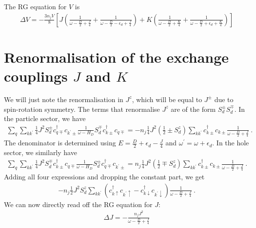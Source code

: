\documentclass{report}
\numberwithin{equation}{section}
\begin{document}
\begin{appendices}
The RG equation for \(V\) is
\begin{equation}\begin{aligned}
	\Delta V = -\frac{3n_j V}{8}\left[J\left(\frac{1}{\omega - \frac{D}{2} + \frac{J}{4}} + \frac{1}{\omega - \frac{D}{2} - \epsilon_d + \frac{J}{4}}\right) + K \left(\frac{1}{\omega - \frac{D}{2} + \frac{K}{4}} + \frac{1}{\omega - \frac{D}{2} + \epsilon_d + \frac{K}{4}}\right)\right]
\end{aligned}\end{equation}

\section{Renormalisation of the exchange couplings \(J\) and \(K\)}
We will just note the renormalisation in \(J^z\), which will be equal to \(J^\pm\) due to spin-rotation symmetry. The terms that renormalise \(J^z\) are of the form \(S_d^\pm S_d^\mp\). In the particle sector, we have
\begin{equation}\begin{aligned}
	\sum_{q} \sum_{kk^\prime}\frac{1}{4}J^2 S_d^\pm c^\dagger_{q\mp}c_{k^\prime\pm} \frac{1}{\omega - H_D}S_d^\mp c^\dagger_{k\pm}c_{q\mp} = -n_j \frac{1}{4}J^2 \left(\frac{1}{2} \pm S_d^z\right) \sum_{kk^\prime}c^\dagger_{k \pm}c_{k\pm} \frac{1}{\omega - \frac{D}{2} + \frac{J}{4}}~.
\end{aligned}\end{equation}
The denominator is determined using \(E = \frac{D}{2} + \epsilon_d - \frac{J}{4}\) and \(\omega^\prime = \omega + \epsilon_d\).
In the hole sector, we similarly have
\begin{equation}\begin{aligned}
	\sum_{q} \sum_{kk^\prime}\frac{1}{4}J^2 S_d^\mp c^\dagger_{k\pm}c_{q\mp} \frac{1}{\omega - H_D}S_d^\pm c^\dagger_{q\mp}c_{k^\prime\pm} = n_j \frac{1}{4}J^2 \left(\frac{1}{2} \mp S_d^z\right) \sum_{kk^\prime}c^\dagger_{k \pm}c_{k\pm} \frac{1}{\omega - \frac{D}{2} + \frac{J}{4}}~.
\end{aligned}\end{equation}
Adding all four expressions and dropping the constant part, we get
\begin{equation}\begin{aligned}
	-n_j \frac{1}{2}J^2 S_d^z \sum_{kk^\prime}\left(c^\dagger_{k \uparrow}c_{k^\prime \uparrow} - c^\dagger_{k \downarrow}c_{k^\prime \downarrow}\right) \frac{1}{\omega - \frac{D}{2} + \frac{J}{4}}~.
\end{aligned}\end{equation}
We can now directly read off the RG equation for \(J\):
\begin{equation}\begin{aligned}
	\Delta J = -\frac{n_j J^2}{\omega - \frac{D}{2} + \frac{J}{4}}
\end{aligned}\end{equation}


\end{appendices}
\end{document}
